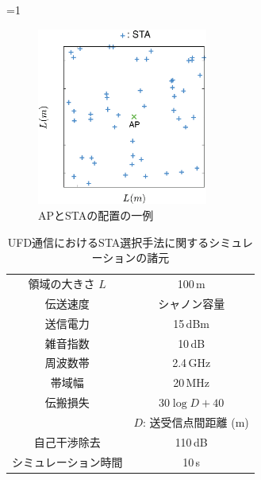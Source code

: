 \documentclass[master]{kuisthesis}		%
\newcounter{flagFig}
\begin{document}
			\ifnum\value{flagFig}=1 {\begin{figure}[htbp]
				\begin{center}
					\includegraphics[width=0.5\textwidth]{fig/pos.eps}
					\caption{APとSTAの配置の一例}
					\label{fig:pos}
				\end{center}
			\end{figure}}\fi

			\begin{table}[htbp]
				\centering
				\caption{UFD通信におけるSTA選択手法に関するシミュレーションの諸元}
				\label{tab:param}
				\begin{tabular}{cc} \hline
					領域の大きさ $L$ & 100\,m \\
					伝送速度 & シャノン容量 \\
					送信電力 & 15\,dBm \\
					雑音指数 & 10\,dB \\
					周波数帯 & 2.4\,GHz \\
					帯域幅 & 20\,MHz \\
					伝搬損失 & $30\log D + 40$\\
					&$D$: 送受信点間距離 (m)\\
					自己干渉除去 & 110\,dB \\
					シミュレーション時間 & 10\,s \\\hline
				\end{tabular}
			\end{table}
\end{document}

